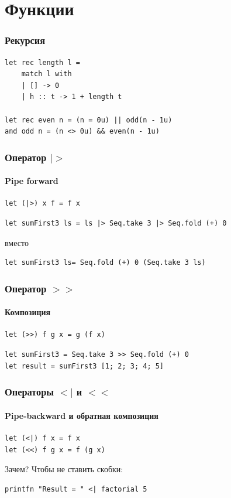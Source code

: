 \documentclass[xetex,mathserif,serif]{beamer}
\begin{document}
	\section{Функции}

	\begin{frame}[fragile]
		\frametitle{Рекурсия}
		\begin{verbatim}
let rec length l =
    match l with
    | [] -> 0
    | h :: t -> 1 + length t

let rec even n = (n = 0u) || odd(n - 1u)
and odd n = (n <> 0u) && even(n - 1u)
		\end{verbatim}
\end{frame}

	\begin{frame}[fragile]
		\frametitle{Оператор $|>$}
		\framesubtitle{Pipe forward}
		\begin{verbatim}
let (|>) x f = f x
		\end{verbatim}

		\begin{verbatim}
let sumFirst3 ls = ls |> Seq.take 3 |> Seq.fold (+) 0
		\end{verbatim}
		вместо
		\begin{verbatim}
let sumFirst3 ls= Seq.fold (+) 0 (Seq.take 3 ls)
		\end{verbatim}
\end{frame}

	\begin{frame}[fragile]
		\frametitle{Оператор $>>$}
		\framesubtitle{Композиция}
		\begin{verbatim}
let (>>) f g x = g (f x)
		\end{verbatim}
		\begin{verbatim}
let sumFirst3 = Seq.take 3 >> Seq.fold (+) 0
let result = sumFirst3 [1; 2; 3; 4; 5]
		\end{verbatim}
\end{frame}

	\begin{frame}[fragile]
		\frametitle{Операторы $<|$ и $<<$}
		\framesubtitle{Pipe-backward и обратная композиция}
		\begin{verbatim}
let (<|) f x = f x
let (<<) f g x = f (g x)
		\end{verbatim}
		Зачем? Чтобы не ставить скобки:
		\begin{verbatim}
printfn "Result = " <| factorial 5
		\end{verbatim}
\end{frame}
\end{document}
